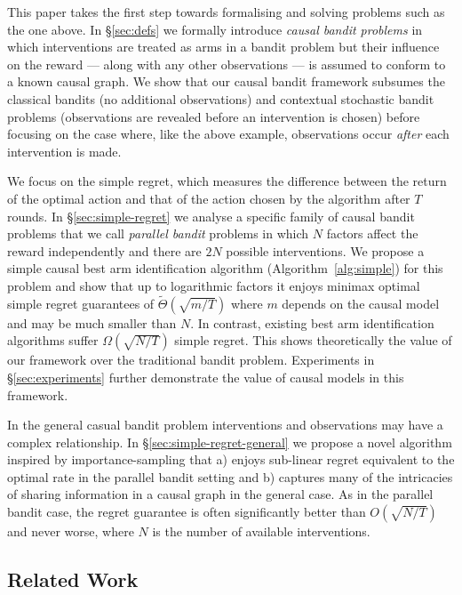This paper takes the first step towards formalising and solving problems such as the one above. 
In \S\ref{sec:defs} we formally introduce \emph{causal bandit problems} in which interventions are treated as arms in a bandit problem but their influence on the reward --- along with any other observations --- is assumed to conform to a known causal graph. 
We show that our causal bandit framework subsumes the classical bandits (no additional observations) and contextual stochastic bandit problems (observations are revealed before an intervention is chosen) before focusing on the case where, like the above example, observations occur \emph{after} each intervention is made.

We focus on the simple regret, which measures the difference between the return of the optimal action and that of the action chosen by the algorithm after $T$ rounds.
In \S\ref{sec:simple-regret} we analyse a specific family of causal bandit problems that we call \emph{parallel bandit} problems in which $N$ factors affect the reward independently and there are $2N$ possible interventions.
We propose a simple causal best arm identification algorithm (Algorithm~\ref{alg:simple}) for this problem and show that up to logarithmic factors it enjoys minimax optimal
simple regret guarantees of $\tilde\Theta(\sqrt{m/T})$ where $m$ depends on the causal model and may be much smaller than $N$.
In contrast, existing best arm identification algorithms suffer $\Omega(\sqrt{N/T})$ simple regret.
This shows theoretically the value of our framework over the traditional bandit problem. 
Experiments in \S\ref{sec:experiments} further demonstrate the value of causal models in this framework.

In the general casual bandit problem interventions and observations may have a complex relationship. 
In \S\ref{sec:simple-regret-general} we propose a novel algorithm inspired by importance-sampling that a) enjoys sub-linear regret equivalent to the optimal rate in the parallel bandit setting and b) captures many of the intricacies of sharing information in a causal graph in the general case.
As in the parallel bandit case, the regret guarantee is often significantly better than $O(\sqrt{N/T})$ and never worse, where $N$ is the number of available interventions.



\subsection{Related Work}

